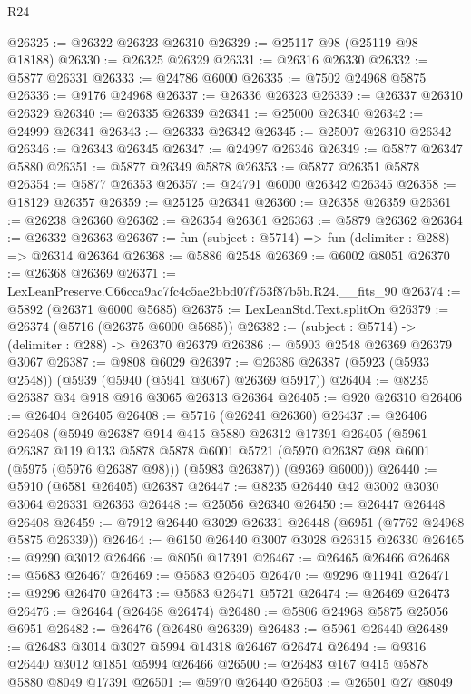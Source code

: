 \begin{lexlean}{R24}
\begin{coremodule}
@26325 := @26322 @26323 @26310
@26329 := @25117 @98 (@25119 @98 @18188)
@26330 := @26325 @26329
@26331 := @26316 @26330
@26332 := @5877 @26331
@26333 := @24786 @6000
@26335 := @7502 @24968 @5875
@26336 := @9176 @24968
@26337 := @26336 @26323
@26339 := @26337 @26310 @26329
@26340 := @26335 @26339
@26341 := @25000 @26340
@26342 := @24999 @26341
@26343 := @26333 @26342
@26345 := @25007 @26310 @26342
@26346 := @26343 @26345
@26347 := @24997 @26346
@26349 := @5877 @26347 @5880
@26351 := @5877 @26349 @5878
@26353 := @5877 @26351 @5878
@26354 := @5877 @26353
@26357 := @24791 @6000 @26342 @26345
@26358 := @18129 @26357
@26359 := @25125 @26341
@26360 := @26358 @26359
@26361 := @26238 @26360
@26362 := @26354 @26361
@26363 := @5879 @26362
@26364 := @26332 @26363
@26367 := fun (subject : @5714) => fun (delimiter : @288) => @26314 @26364
@26368 := @5886 @2548
@26369 := @6002 @8051
@26370 := @26368 @26369
@26371 := LexLeanPreserve.C66cca9ac7fc4c5ae2bbd07f753f87b5b.R24.__fits_90
@26374 := @5892 (@26371 @6000 @5685)
@26375 := LexLeanStd.Text.splitOn
@26379 := @26374 (@5716 (@26375 @6000 @5685))
@26382 := (subject : @5714) -> (delimiter : @288) -> @26370 @26379
@26386 := @5903 @2548 @26369 @26379 @3067
@26387 := @9808 @6029
@26397 := @26386 @26387 (@5923 (@5933 @2548)) (@5939 (@5940 (@5941 @3067) @26369 @5917))
@26404 := @8235 @26387 @34 @918 @916 @3065 @26313 @26364
@26405 := @920 @26310
@26406 := @26404 @26405
@26408 := @5716 (@26241 @26360)
@26437 := @26406
    @26408
    (@5949
      @26387
      @914
      @415
      @5880
      @26312
      @17391
      @26405
      (@5961
        @26387
        @119
        @133
        @5878
        @5878
        @6001
        @5721
        (@5970 @26387 @98 @6001 (@5975 (@5976 @26387 @98)))
        (@5983 @26387))
      (@9369 @6000))
@26440 := @5910 (@6581 @26405) @26387
@26447 := @8235 @26440 @42 @3002 @3030 @3064 @26331 @26363
@26448 := @25056 @26340
@26450 := @26447 @26448 @26408
@26459 := @7912 @26440 @3029 @26331 @26448 (@6951 (@7762 @24968 @5875 @26339))
@26464 := @6150 @26440 @3007 @3028 @26315 @26330
@26465 := @9290 @3012
@26466 := @8050 @17391
@26467 := @26465 @26466
@26468 := @5683 @26467
@26469 := @5683 @26405
@26470 := @9296 @11941
@26471 := @9296 @26470
@26473 := @5683 @26471 @5721
@26474 := @26469 @26473
@26476 := @26464 (@26468 @26474)
@26480 := @5806 @24968 @5875 @25056 @6951
@26482 := @26476 (@26480 @26339)
@26483 := @5961 @26440
@26489 := @26483 @3014 @3027 @5994 @14318 @26467 @26474
@26494 := @9316 @26440 @3012 @1851 @5994 @26466
@26500 := @26483 @167 @415 @5878 @5880 @8049 @17391
@26501 := @5970 @26440
@26503 := @26501 @27 @8049

\end{coremodule}
\end{lexlean}

